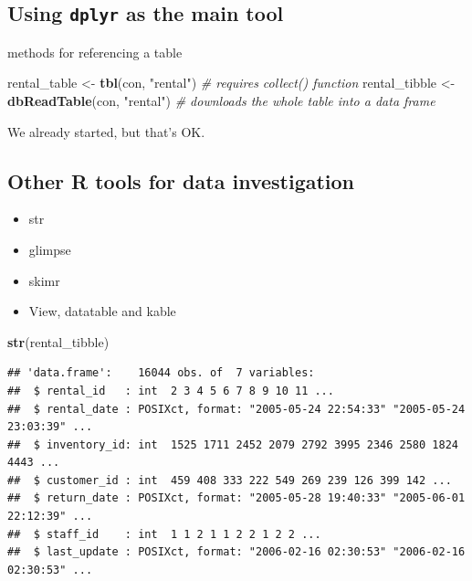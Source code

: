 \documentclass[]{book}
\newenvironment{Shaded}{\begin{snugshade}}{\end{snugshade}}
\newcommand{\CommentTok}[1]{\textcolor[rgb]{0.56,0.35,0.01}{\textit{#1}}}
\newcommand{\KeywordTok}[1]{\textcolor[rgb]{0.13,0.29,0.53}{\textbf{#1}}}
\newcommand{\NormalTok}[1]{#1}
\newcommand{\StringTok}[1]{\textcolor[rgb]{0.31,0.60,0.02}{#1}}
\providecommand{\tightlist}{%
  \setlength{\itemsep}{0pt}\setlength{\parskip}{0pt}}
\theoremstyle{definition}
\theoremstyle{definition}
\theoremstyle{definition}
\theoremstyle{remark}
\begin{document}
\hypertarget{using-dplyr-as-the-main-tool}{%
\subsection{\texorpdfstring{Using \texttt{dplyr} as the main
tool}{Using dplyr as the main tool}}\label{using-dplyr-as-the-main-tool}}

methods for referencing a table

\begin{Shaded}
\begin{Highlighting}[]
\NormalTok{rental_table <-}\StringTok{ }\KeywordTok{tbl}\NormalTok{(con, }\StringTok{"rental"}\NormalTok{)  }\CommentTok{# requires collect() function}
\NormalTok{rental_tibble <-}\StringTok{ }\KeywordTok{dbReadTable}\NormalTok{(con, }\StringTok{"rental"}\NormalTok{) }\CommentTok{# downloads the whole table into a data frame}
\end{Highlighting}
\end{Shaded}

We already started, but that's OK.

\hypertarget{other-r-tools-for-data-investigation}{%
\subsection{Other R tools for data
investigation}\label{other-r-tools-for-data-investigation}}

\begin{itemize}
\tightlist
\item
  str
\item
  glimpse
\item
  skimr
\item
  View, datatable and kable
\end{itemize}

\begin{Shaded}
\begin{Highlighting}[]
\KeywordTok{str}\NormalTok{(rental_tibble)}
\end{Highlighting}
\end{Shaded}

\begin{verbatim}
## 'data.frame':    16044 obs. of  7 variables:
##  $ rental_id   : int  2 3 4 5 6 7 8 9 10 11 ...
##  $ rental_date : POSIXct, format: "2005-05-24 22:54:33" "2005-05-24 23:03:39" ...
##  $ inventory_id: int  1525 1711 2452 2079 2792 3995 2346 2580 1824 4443 ...
##  $ customer_id : int  459 408 333 222 549 269 239 126 399 142 ...
##  $ return_date : POSIXct, format: "2005-05-28 19:40:33" "2005-06-01 22:12:39" ...
##  $ staff_id    : int  1 1 2 1 1 2 2 1 2 2 ...
##  $ last_update : POSIXct, format: "2006-02-16 02:30:53" "2006-02-16 02:30:53" ...
\end{verbatim}
\end{document}
